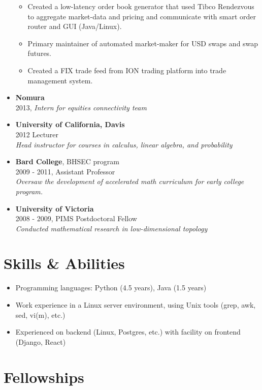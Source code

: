 \documentclass[margin]{res}
\def\tightlist{}
\begin{document}
\begin{resume}
\begin{itemize}
  \begin{itemize}
  \tightlist
  \item
    Created a low-latency order book generator that used Tibco
    Rendezvous to aggregate market-data and pricing and communicate with
    smart order router and GUI (Java/Linux).
  \item
    Primary maintainer of automated market-maker for USD swaps and swap
    futures.
  \item
    Created a FIX trade feed from ION trading platform into trade
    management system.
  \end{itemize}
\item
  \textbf{Nomura}\\
  2013, \emph{Intern for equities connectivity team}
\item
  \textbf{University of California, Davis}\\
  2012 Lecturer\\
  \emph{Head instructor for courses in calculus, linear algebra, and
  probability}
\item
  \textbf{Bard College}, BHSEC program\\
  2009 - 2011, Assistant Professor\\
  \emph{Oversaw the development of accelerated math curriculum for early
  college program.}
\item
  \textbf{University of Victoria}\\
  2008 - 2009, PIMS Postdoctoral Fellow\\
  \emph{Conducted mathematical research in low-dimensional topology}
\end{itemize}

\hypertarget{skills-abilities}{%
\section{Skills \& Abilities}\label{skills-abilities}}

\begin{itemize}
\tightlist
\item
  Programming languages: {Python} (4.5 years), {Java} (1.5 years)
\item
  Work experience in a Linux server environment, using Unix tools (grep,
  awk, sed, vi(m), etc.)
\item
  Experienced on backend (Linux, Postgres, etc.) with facility on
  frontend (Django, React)
\end{itemize}

\hypertarget{fellowships}{%
\section{Fellowships}\label{fellowships}}


\end{resume}
\end{document}
